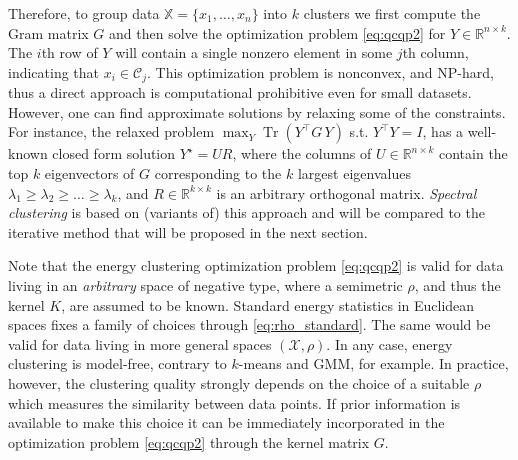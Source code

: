 \documentclass[twoside]{article}
\DeclareMathOperator{\Tr}{Tr}
\newcommand\kk{K}
\newcommand\C{{\mathcal{C}}}
\newcommand\Zt{Y}
\begin{document}
Therefore, to group data
$\mathbb{X} = \{ x_1,\dotsc,x_n \}$
into  $k$ clusters we first compute the Gram matrix
$G$ and then 
solve the optimization problem \eqref{eq:qcqp2} for $\Zt \in
\mathbb{R}^{n\times k}$. The $i$th row
of $\Zt$ will contain a single nonzero element in some $j$th column,
indicating that $x_i \in \C_j$. 
This optimization problem is nonconvex, and NP-hard,
thus a direct approach 
is computational prohibitive even for small datasets.
However, one can find approximate solutions by relaxing some 
of the constraints.
For instance, the relaxed problem
$\max_{Y} \Tr \left( Y^\top G \, Y \right)$ s.t. $Y^\top Y = I$,
has a well-known closed form solution $Y^\star = U R$, where the
columns of $U \in \mathbb{R}^{n\times k}$ 
contain the top $k$ eigenvectors of $G$ corresponding
to the $k$ largest eigenvalues $\lambda_1\ge \lambda_2\ge\dotsc\ge\lambda_k$, 
and
$R \in \mathbb{R}^{k\times k}$ is an arbitrary orthogonal matrix. 
\emph{Spectral clustering} is based on (variants of) this approach 
and will be compared to the iterative method that will be proposed 
in the next section.

Note that the energy clustering optimization problem \eqref{eq:qcqp2} 
is valid for data living in an \emph{arbitrary} space of negative type, where
a semimetric $\rho$, and thus the kernel $\kk$, are
assumed to be known. Standard energy statistics in
Euclidean spaces fixes a family of choices through 
\eqref{eq:rho_standard}.
The same would be valid for data living in more general
spaces $(\mathcal{X}, \rho)$.
In any case, energy  clustering 
is model-free, 
contrary to $k$-means and GMM, for example.
In practice, however,
the clustering quality strongly depends on the choice of a suitable
$\rho$ which measures the similarity between data points.
If prior information is available to make this choice
it can be immediately incorporated in the 
optimization problem \eqref{eq:qcqp2} through the kernel matrix $G$.
\end{document}
